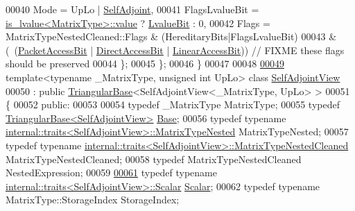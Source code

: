 \begin{DoxyCode}
00040     Mode = UpLo | \hyperlink{group__enums_gga39e3366ff5554d731e7dc8bb642f83cda2491fc6765056421f504eb7e16083e8f}{SelfAdjoint},
00041     FlagsLvalueBit = \hyperlink{struct_eigen_1_1internal_1_1is__lvalue}{is\_lvalue<MatrixType>::value} ? 
      \hyperlink{group__flags_gae2c323957f20dfdc6cb8f44428eaec1a}{LvalueBit} : 0,
00042     Flags =  MatrixTypeNestedCleaned::Flags & (HereditaryBits|FlagsLvalueBit)
00043            & (~(\hyperlink{group__flags_ga1a306a438e1ab074e8be59512e887b9f}{PacketAccessBit} | \hyperlink{group__flags_gabf1e9d0516a933445a4c307ad8f14915}{DirectAccessBit} | 
      \hyperlink{group__flags_ga4b983a15d57cd55806df618ac544d09e}{LinearAccessBit})) \textcolor{comment}{// FIXME these flags should be preserved}
00044   \};
00045 \};
00046 \}
00047 
00048 
\hyperlink{group___core___module}{00049} \textcolor{keyword}{template}<\textcolor{keyword}{typename} \_MatrixType, \textcolor{keywordtype}{unsigned} \textcolor{keywordtype}{int} UpLo> \textcolor{keyword}{class }\hyperlink{group___core___module_class_eigen_1_1_self_adjoint_view}{SelfAdjointView}
00050   : \textcolor{keyword}{public} \hyperlink{group___core___module_class_eigen_1_1_triangular_base}{TriangularBase}<SelfAdjointView<\_MatrixType, UpLo> >
00051 \{
00052   \textcolor{keyword}{public}:
00053 
00054     \textcolor{keyword}{typedef} \_MatrixType MatrixType;
00055     \textcolor{keyword}{typedef} \hyperlink{group___core___module_class_eigen_1_1_triangular_base}{TriangularBase<SelfAdjointView>} \hyperlink{group___core___module_class_eigen_1_1_triangular_base}{Base};
00056     \textcolor{keyword}{typedef} \textcolor{keyword}{typename} \hyperlink{struct_eigen_1_1internal_1_1traits}{internal::traits<SelfAdjointView>::MatrixTypeNested}
       MatrixTypeNested;
00057     \textcolor{keyword}{typedef} \textcolor{keyword}{typename} \hyperlink{struct_eigen_1_1internal_1_1traits}{internal::traits<SelfAdjointView>::MatrixTypeNestedCleaned}
       MatrixTypeNestedCleaned;
00058     \textcolor{keyword}{typedef} MatrixTypeNestedCleaned NestedExpression;
00059 
\hyperlink{group___core___module_af52acc0942ece2de9b6db4a99cc6656e}{00061}     \textcolor{keyword}{typedef} \textcolor{keyword}{typename} \hyperlink{struct_eigen_1_1internal_1_1traits}{internal::traits<SelfAdjointView>::Scalar} 
      \hyperlink{group___core___module_af52acc0942ece2de9b6db4a99cc6656e}{Scalar}; 
00062     \textcolor{keyword}{typedef} \textcolor{keyword}{typename} MatrixType::StorageIndex StorageIndex;

\end{DoxyCode}
